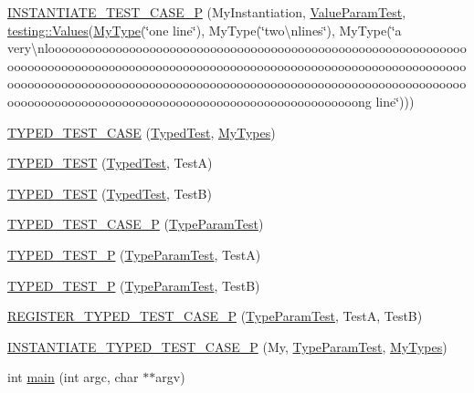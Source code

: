 \begin{DoxyCompactItemize}
\item 
\mbox{\hyperlink{googletest-list-tests-unittest___8cc_aae3f9f4ba0f7ea179b0976679d0906c6}{I\+N\+S\+T\+A\+N\+T\+I\+A\+T\+E\+\_\+\+T\+E\+S\+T\+\_\+\+C\+A\+S\+E\+\_\+P}} (My\+Instantiation, \mbox{\hyperlink{classValueParamTest}{Value\+Param\+Test}}, \mbox{\hyperlink{namespacetesting_a8209ef59db08b8ad4beed30d8d6e6a88}{testing\+::\+Values}}(\mbox{\hyperlink{classMyType}{My\+Type}}(\char`\"{}one line\char`\"{}), My\+Type(\char`\"{}two\textbackslash{}nlines\char`\"{}), My\+Type(\char`\"{}a very\textbackslash{}nloooooooooooooooooooooooooooooooooooooooooooooooooooooooooooooooooooooooooooooooooooooooooooooooooooooooooooooooooooooooooooooooooooooooooooooooooooooooooooooooooooooooooooooooooooooooooooooooooooooooooooooooooooooooooooooooooooooooooooooooooooooooooong line\char`\"{})))
\item 
\mbox{\hyperlink{googletest-list-tests-unittest___8cc_a862ed8944c2b3e4827e95002d20c45d3}{T\+Y\+P\+E\+D\+\_\+\+T\+E\+S\+T\+\_\+\+C\+A\+SE}} (\mbox{\hyperlink{classTypedTest}{Typed\+Test}}, \mbox{\hyperlink{googletest-list-tests-unittest___8cc_a16f58cd49c18568802322bbaf9f3f654}{My\+Types}})
\item 
\mbox{\hyperlink{googletest-list-tests-unittest___8cc_a83ec84c5fac9fdffa59a16e5d043bd66}{T\+Y\+P\+E\+D\+\_\+\+T\+E\+ST}} (\mbox{\hyperlink{classTypedTest}{Typed\+Test}}, TestA)
\item 
\mbox{\hyperlink{googletest-list-tests-unittest___8cc_a1ac7e35f3d659458b18cc29d71ed1f46}{T\+Y\+P\+E\+D\+\_\+\+T\+E\+ST}} (\mbox{\hyperlink{classTypedTest}{Typed\+Test}}, TestB)
\item 
\mbox{\hyperlink{googletest-list-tests-unittest___8cc_a8f36af28829ba875ca3675b4054f48b6}{T\+Y\+P\+E\+D\+\_\+\+T\+E\+S\+T\+\_\+\+C\+A\+S\+E\+\_\+P}} (\mbox{\hyperlink{classTypeParamTest}{Type\+Param\+Test}})
\item 
\mbox{\hyperlink{googletest-list-tests-unittest___8cc_aadd51dfff9d63b5e0faa0130697684c1}{T\+Y\+P\+E\+D\+\_\+\+T\+E\+S\+T\+\_\+P}} (\mbox{\hyperlink{classTypeParamTest}{Type\+Param\+Test}}, TestA)
\item 
\mbox{\hyperlink{googletest-list-tests-unittest___8cc_a667494b5b0e4418064679f58c546db97}{T\+Y\+P\+E\+D\+\_\+\+T\+E\+S\+T\+\_\+P}} (\mbox{\hyperlink{classTypeParamTest}{Type\+Param\+Test}}, TestB)
\item 
\mbox{\hyperlink{googletest-list-tests-unittest___8cc_a3316a9dc1c581f96a50ec10e0c116e5c}{R\+E\+G\+I\+S\+T\+E\+R\+\_\+\+T\+Y\+P\+E\+D\+\_\+\+T\+E\+S\+T\+\_\+\+C\+A\+S\+E\+\_\+P}} (\mbox{\hyperlink{classTypeParamTest}{Type\+Param\+Test}}, TestA, TestB)
\item 
\mbox{\hyperlink{googletest-list-tests-unittest___8cc_abace4e22d147fb69e2be527b355a2316}{I\+N\+S\+T\+A\+N\+T\+I\+A\+T\+E\+\_\+\+T\+Y\+P\+E\+D\+\_\+\+T\+E\+S\+T\+\_\+\+C\+A\+S\+E\+\_\+P}} (My, \mbox{\hyperlink{classTypeParamTest}{Type\+Param\+Test}}, \mbox{\hyperlink{googletest-list-tests-unittest___8cc_a16f58cd49c18568802322bbaf9f3f654}{My\+Types}})
\item 
int \mbox{\hyperlink{googletest-list-tests-unittest___8cc_a3c04138a5bfe5d72780bb7e82a18e627}{main}} (int argc, char $\ast$$\ast$argv)
\end{DoxyCompactItemize}


